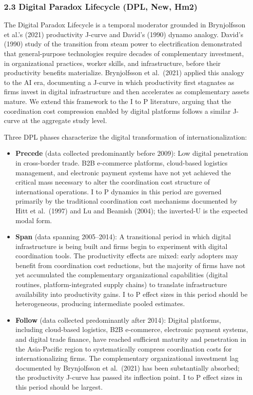 \documentclass[
  12pt,a4paper]{article}
\providecommand{\tightlist}{%
  \setlength{\itemsep}{0pt}\setlength{\parskip}{0pt}}
\begin{document}
\hypertarget{digital-paradox-lifecycle-dpl-new-hm2}{%
\subsubsection{2.3 Digital Paradox Lifecycle (DPL, New,
Hm2)}\label{digital-paradox-lifecycle-dpl-new-hm2}}

The Digital Paradox Lifecycle is a temporal moderator grounded in
Brynjolfsson et al.'s (2021) productivity J-curve and David's (1990)
dynamo analogy. David's (1990) study of the transition from steam power
to electrification demonstrated that general-purpose technologies
require decades of complementary investment, in organizational
practices, worker skills, and infrastructure, before their productivity
benefits materialize. Brynjolfsson et al.~(2021) applied this analogy to
the AI era, documenting a J-curve in which productivity first stagnates
as firms invest in digital infrastructure and then accelerates as
complementary assets mature. We extend this framework to the I to P
literature, arguing that the coordination cost compression enabled by
digital platforms follows a similar J-curve at the aggregate study
level.

Three DPL phases characterize the digital transformation of
internationalization:

\begin{itemize}
\tightlist
\item
  \textbf{Precede} (data collected predominantly before 2009): Low
  digital penetration in cross-border trade. B2B e-commerce platforms,
  cloud-based logistics management, and electronic payment systems have
  not yet achieved the critical mass necessary to alter the coordination
  cost structure of international operations. I to P dynamics in this
  period are governed primarily by the traditional coordination cost
  mechanisms documented by Hitt et al.~(1997) and Lu and Beamish (2004);
  the inverted-U is the expected modal form.
\item
  \textbf{Span} (data spanning 2005--2014): A transitional period in
  which digital infrastructure is being built and firms begin to
  experiment with digital coordination tools. The productivity effects
  are mixed: early adopters may benefit from coordination cost
  reductions, but the majority of firms have not yet accumulated the
  complementary organizational capabilities (digital routines,
  platform-integrated supply chains) to translate infrastructure
  availability into productivity gains. I to P effect sizes in this
  period should be heterogeneous, producing intermediate pooled
  estimates.
\item
  \textbf{Follow} (data collected predominantly after 2014): Digital
  platforms, including cloud-based logistics, B2B e-commerce, electronic
  payment systems, and digital trade finance, have reached sufficient
  maturity and penetration in the Asia-Pacific region to systematically
  compress coordination costs for internationalizing firms. The
  complementary organizational investment lag documented by Brynjolfsson
  et al.~(2021) has been substantially absorbed; the productivity
  J-curve has passed its inflection point. I to P effect sizes in this
  period should be largest.
\end{itemize}
\end{document}
